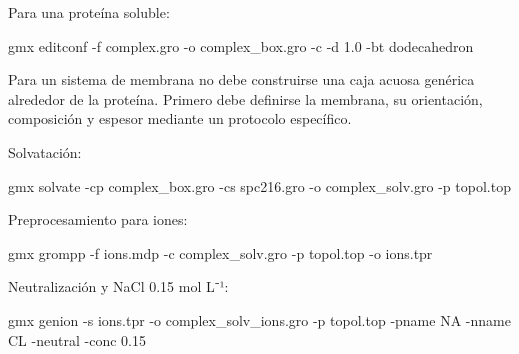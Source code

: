 \documentclass[
  spanish,
  11pt,
  a4paper]{article}
\newenvironment{Shaded}{\begin{snugshade}}{\end{snugshade}}
\newcommand{\AttributeTok}[1]{\textcolor[rgb]{0.13,0.29,0.53}{#1}}
\newcommand{\ExtensionTok}[1]{#1}
\newcommand{\NormalTok}[1]{#1}
\begin{document}
Para una proteína soluble:

\begin{Shaded}
\begin{Highlighting}[]
\ExtensionTok{gmx}\NormalTok{ editconf     }\AttributeTok{{-}f}\NormalTok{ complex.gro     }\AttributeTok{{-}o}\NormalTok{ complex\_box.gro     }\AttributeTok{{-}c}     \AttributeTok{{-}d}\NormalTok{ 1.0     }\AttributeTok{{-}bt}\NormalTok{ dodecahedron}
\end{Highlighting}
\end{Shaded}

Para un sistema de membrana no debe construirse una caja acuosa genérica
alrededor de la proteína. Primero debe definirse la membrana, su
orientación, composición y espesor mediante un protocolo específico.

Solvatación:

\begin{Shaded}
\begin{Highlighting}[]
\ExtensionTok{gmx}\NormalTok{ solvate     }\AttributeTok{{-}cp}\NormalTok{ complex\_box.gro     }\AttributeTok{{-}cs}\NormalTok{ spc216.gro     }\AttributeTok{{-}o}\NormalTok{ complex\_solv.gro     }\AttributeTok{{-}p}\NormalTok{ topol.top}
\end{Highlighting}
\end{Shaded}

Preprocesamiento para iones:

\begin{Shaded}
\begin{Highlighting}[]
\ExtensionTok{gmx}\NormalTok{ grompp     }\AttributeTok{{-}f}\NormalTok{ ions.mdp     }\AttributeTok{{-}c}\NormalTok{ complex\_solv.gro     }\AttributeTok{{-}p}\NormalTok{ topol.top     }\AttributeTok{{-}o}\NormalTok{ ions.tpr}
\end{Highlighting}
\end{Shaded}

Neutralización y NaCl 0.15 mol L⁻¹:

\begin{Shaded}
\begin{Highlighting}[]
\ExtensionTok{gmx}\NormalTok{ genion     }\AttributeTok{{-}s}\NormalTok{ ions.tpr     }\AttributeTok{{-}o}\NormalTok{ complex\_solv\_ions.gro     }\AttributeTok{{-}p}\NormalTok{ topol.top     }\AttributeTok{{-}pname}\NormalTok{ NA     }\AttributeTok{{-}nname}\NormalTok{ CL     }\AttributeTok{{-}neutral}     \AttributeTok{{-}conc}\NormalTok{ 0.15}
\end{Highlighting}
\end{Shaded}
\end{document}

